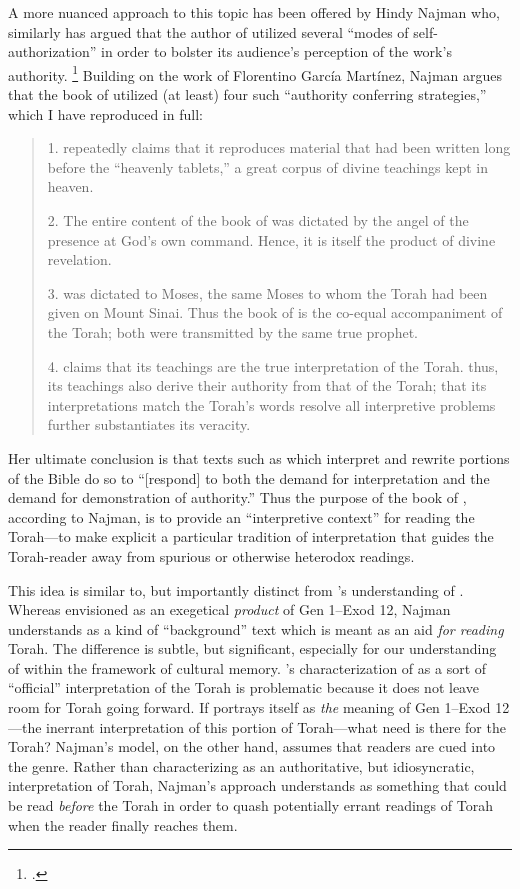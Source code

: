 A more nuanced approach to this topic has been offered by Hindy Najman who, similarly has argued that the author of \jub utilized several ``modes of self-authorization'' in order to bolster its audience's perception of the work's authority.%
    \footnote{\cite[380]{najman_jsj1999}.}
Building on the work of Florentino García Martínez,\autocite{martinez_najman-tigchelaar2012} Najman argues that the book of \jub utilized (at least) four such ``authority conferring strategies,'' which I have reproduced in full:
    \begin{quote}
        1. \jub repeatedly claims that it reproduces material that had been written long before the ``heavenly tablets,'' a great corpus of divine teachings kept in heaven.

        2. The entire content of the book of \jub was dictated by the angel of the presence at God's own command. Hence, it is itself the product of divine revelation.

        3. \jub was dictated to Moses, the same Moses to whom the Torah had been given on Mount Sinai. Thus the book of \jub is the co-equal accompaniment of the Torah; both were transmitted by the same true prophet.

        4. \jub claims that its teachings are the true interpretation of the Torah. thus, its teachings also derive their authority from that of the Torah; that its interpretations match the Torah's words resolve all interpretive problems further substantiates its veracity.%
        \autocite[380]{najman_jsj1999}
    \end{quote}
\noindent
Her ultimate conclusion is that texts such as \jub which interpret and rewrite portions of the Bible do so to ``[respond] to both the demand for interpretation and the demand for demonstration of authority.''\autocite[408]{najman_jsj1999} Thus the purpose of the book of \jub, according to Najman, is to provide an ``interpretive context'' for reading the Torah---to make explicit a particular tradition of interpretation that guides the Torah-reader away from spurious or otherwise heterodox readings. 

This idea is similar to, but importantly distinct from \vanderkam's understanding of \jub. Whereas \vanderkam envisioned \jub as an exegetical \emph{product} of Gen 1--Exod 12, Najman understands \jub as a kind of ``background'' text which is meant as an aid \emph{for reading} Torah. The difference is subtle, but significant, especially for our understanding of \jub within the framework of cultural memory. \vanderkam's characterization of \jub as a sort of ``official'' interpretation of the Torah is problematic because it does not leave room for Torah going forward. If \jub portrays itself as \emph{the} meaning of Gen 1--Exod 12---the inerrant interpretation of this portion of Torah---what need is there for the Torah? Najman's model, on the other hand, assumes that readers are cued into the genre. Rather than  characterizing \jub as an authoritative, but idiosyncratic, interpretation of Torah, Najman's approach understands \jub as something that could be read \emph{before} the Torah in order to quash potentially errant readings of Torah when the reader finally reaches them.\autocite[408]{najman_jsj1999}

